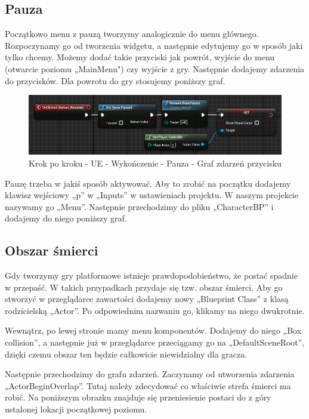 \documentclass[openright]{xmgr}
\begin{document}
\newpage
\subsection{Pauza}

Początkowo menu z pauzą tworzymy analogicznie do menu głównego. Rozpoczynamy go od tworzenia widgetu, a następnie edytujemy go w sposób jaki tylko chcemy. Możemy dodać takie przyciski jak powrót, wyjście do menu (otwarcie poziomu „MainMenu") czy wyjście z gry. Następnie dodajemy zdarzenia do przycisków. Dla powrotu do gry stosujemy poniższy graf.

\begin{figure}[!htb]
    \begin{center}
    \includegraphics[scale=0.5]{Screeny/UeKrokPoKroku/PauseButton}
    \end{center}
    \caption{Krok po kroku - UE - Wykończenie - Pauza - Graf zdarzeń przycisku}
\end{figure}

Pauzę trzeba w jakiś sposób aktywować. Aby to zrobić na początku dodajemy klawisz wejściowy „p” w „Inputs” w ustawieniach projektu. W naszym projekcie nazywamy go „Menu”. Następnie przechodzimy do pliku „CharacterBP” i dodajemy do niego poniższy graf.

\subsection{Obszar śmierci}

Gdy tworzymy gry platformowe istnieje prawdopodobieństwo, że postać spadnie w przepaść. W takich przypadkach przydaje się tzw. obszar śmierci. Aby go stworzyć w przeglądarce zawartości dodajemy nowy „Blueprint Class” z klasą rodzicielską „Actor”. Po odpowiednim nazwaniu go, klikamy na niego dwukrotnie. 

Wewnątrz, po lewej stronie mamy menu komponentów. Dodajemy do niego „Box collision”, a następnie już w przeglądarce przeciągamy go na „DefaultSceneRoot”, dzięki czemu obszar ten będzie całkowicie niewidzialny dla gracza. 

Następnie przechodzimy do grafu zdarzeń. Zaczynamy od utworzenia zdarzenia „ActorBeginOverlap”. Tutaj należy zdecydować co właściwie strefa śmierci ma robić. Na poniższym obrazku znajduje się przeniesienie postaci do z góry ustalonej lokacji początkowej poziomu.
\end{document}
